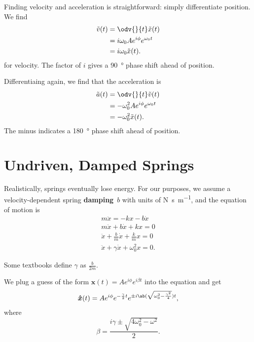 Finding velocity and acceleration is straightforward: simply
differentiate position.
We find
\begin{equation}
    \begin{aligned}
        \tilde{v}(t) &= \odv{}{t} \tilde{x}(t) \\
        &= i \omega_0 A e^{i \phi} e^{\omega_0 t} \\
        &= i \omega_0 \tilde{x}(t).
    \end{aligned}
\end{equation}
for velocity.
The factor of \(i\) gives a \qty{90}{\degree} phase shift ahead of position.

Differentiaing again, we find that the acceleration is
\begin{equation}
    \begin{aligned}
        \tilde{a}(t) &= \odv{}{t} \tilde{v}(t) \\
        &= - \omega_0^2 A e^{i \phi} e^{\omega_0 t} \\
        &= - \omega_0^2 \tilde{x}(t).
    \end{aligned}
\end{equation}
The minus indicates a \qty{180}{\degree} phase shift ahead of position.

\section{Undriven, Damped Springs}

Realistically, springs eventually lose energy.
For our purposes, we assume a velocity-dependent spring \textbf{damping}~\(b\)
with units of \unit{\newton \second \per \metre},
and the equation of motion is
\begin{equation}
    \begin{aligned}
        m \ddot{x} = - k x - b \dot{x} \\
        m \ddot{x} + b \dot{x} + k x = 0 \\
        \ddot{x} + \frac{b}{m} \dot{x} + \frac{k}{m} x = 0 \\
        \ddot{x} + \gamma \dot{x} + \omega_0^2 x = 0.
    \end{aligned}
\end{equation}

Some textbooks define \(\gamma\) as \(\frac{b}{2m}\).

We plug a guess of the form \(\boldsymbol{\hat{x}}(t) = A e^{i \phi}
e^{i \beta t}\) into the equation
and get
\begin{equation}
    \boldsymbol{\hat{x}}(t)
    = A
    e^{i \phi}
    e^{- \frac{\gamma}{2} t}
    e^{
        \pm i
        \ab(\sqrt{\omega_0^2 - \frac{\gamma^2}{4}})
        t
    },
\end{equation}
where
\begin{equation}
    \beta = \frac{i \gamma \pm \sqrt{4\omega_0^2 - \omega^2}}{2}.
\end{equation}

